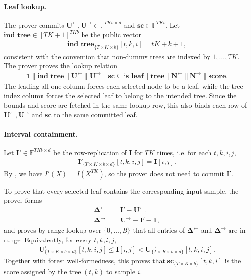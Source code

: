 \paragraph{Leaf lookup.}
The prover commits
$\mathbf{U}^{\leftarrow},\mathbf{U}^{\rightarrow}\in\mathbb{F}^{TKb\times d}$
and $\mathbf{sc}\in\mathbb{F}^{TKb}$.
Let $\mathbf{ind\_tree}\in[TK+1]^{TKb}$ be the public vector
\begin{align}
    \mathbf{ind\_tree}_{\{T\times K\times b\}}[t,k,i] = tK+k+1,
\end{align}
consistent with the convention that non-dummy trees are indexed by
$1,\ldots,TK$.
The prover proves the lookup relation
\begin{align}
    \mathbf{1}\|\mathbf{ind\_tree}\|
    \mathbf{U}^{\leftarrow}\|\mathbf{U}^{\rightarrow}\|\mathbf{sc}
    \subseteq
    \mathbf{is\_leaf}\|\mathbf{tree}\|
    \mathbf{N}^{\leftarrow}\|\mathbf{N}^{\rightarrow}\|\mathbf{score}.
\end{align}
The leading all-one column forces each selected node to be a leaf, while the
tree-index column forces the selected leaf to belong to the intended tree.
Since the bounds and score are fetched in the same lookup row, this also binds
each row of $\mathbf{U}^{\leftarrow},\mathbf{U}^{\rightarrow}$ and
$\mathbf{sc}$ to the same committed leaf.

\paragraph{Interval containment.}
    Let $\mathbf{I}'\in\mathbb{F}^{TKb\times d}$ be the row-replication of $\mathbf{I}$ for $TK$ times, i.e. for each $t,k,i,j$,
    \begin{align}
        \mathbf{I}'_{\{T\times K\times b\times d\}}[t,k,i,j]
        =
        \mathbf{I}[i,j].
    \end{align}
    By , we have
    $I'(X) = I(X^{TK})$,
    so the prover does not need to commit $\mathbf{I}'$.

To prove that every selected leaf contains the corresponding input sample, the
prover forms
\begin{align}
    \pmb{\Delta}^{\leftarrow}
    &=
    \mathbf{I}'-\mathbf{U}^{\leftarrow},\\
    \pmb{\Delta}^{\rightarrow}
    &=
    \mathbf{U}^{\rightarrow}-\mathbf{I}'-\mathbf{1},
\end{align}
and proves by range lookup over $\{0,\ldots,B\}$ that all entries of
$\pmb{\Delta}^{\leftarrow}$ and
$\pmb{\Delta}^{\rightarrow}$ are in range.
Equivalently, for every $t,k,i,j$,
\begin{align}
    \mathbf{U}^{\leftarrow}_{\{T\times K\times b\times d\}}[t,k,i,j]
    \leq
    \mathbf{I}[i,j]
    <
    \mathbf{U}^{\rightarrow}_{\{T\times K\times b\times d\}}[t,k,i,j].
\end{align}
Together with forest well-formedness, this proves that
$\mathbf{sc}_{\{T\times K\times b\}}[t,k,i]$ is the score assigned by the
tree $(t,k)$ to sample $i$.

